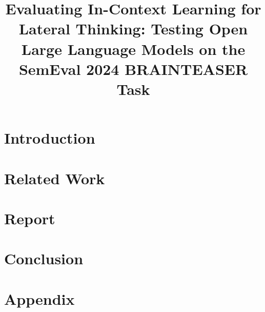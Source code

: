 \documentclass{scrartcl}
\title{Evaluating In-Context Learning for Lateral Thinking: Testing Open Large Language Models on the SemEval 2024 BRAINTEASER Task}
\begin{document}



\begin{abstract}
  
\end{abstract}


\section{Introduction}


\section{Related Work}


\section{Report}


\section{Conclusion}


\clearpage
\appendix
\section{Appendix}


\clearpage
\printbibliography
\end{document}
